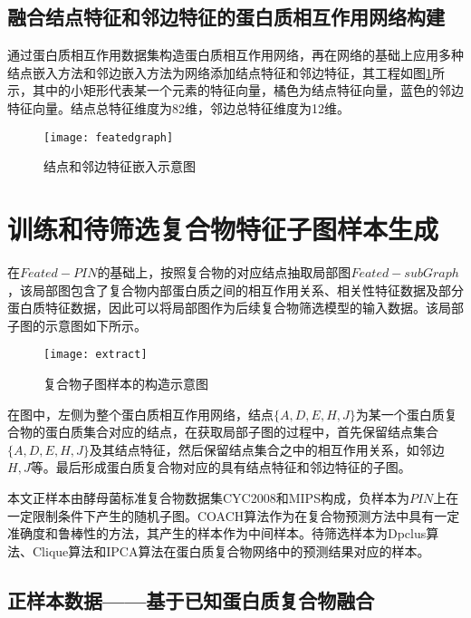 \subsection{融合结点特征和邻边特征的蛋白质相互作用网络构建}
\label{subsection:featPPINetwork:addFeat}

通过蛋白质相互作用数据集构造蛋白质相互作用网络，再在网络的基础上应用多种结点嵌入方法和邻边嵌入方法为网络添加结点特征和邻边特征，其工程如图\ref{fig:featedgraph}所示，其中的小矩形代表某一个元素的特征向量，橘色为结点特征向量，蓝色的邻边特征向量。结点总特征维度为82维，邻边总特征维度为12维。

\begin{figure}[htbp]
    \centering
    \texttt{[image: featedgraph]}
    \caption{结点和邻边特征嵌入示意图}
    \label{fig:featedgraph}
\end{figure}


\section{训练和待筛选复合物特征子图样本生成}
\label{section:featSubNetworkConstruct:allSample}

在$Feated-PIN$的基础上，按照复合物的对应结点抽取局部图$Feated-subGraph$，该局部图包含了复合物内部蛋白质之间的相互作用关系、相关性特征数据及部分蛋白质特征数据，因此可以将局部图作为后续复合物筛选模型的输入数据。该局部子图的示意图如下所示。

\begin{figure}[htbp]
    \centering
    \texttt{[image: extract]}
    \caption{复合物子图样本的构造示意图}
    \label{fig:extract}
\end{figure}
在图中，左侧为整个蛋白质相互作用网络，结点$\{A,D,E,H,J\}$为某一个蛋白质复合物的蛋白质集合对应的结点，在获取局部子图的过程中，首先保留结点集合$\{A,D,E,H,J\}$及其结点特征，然后保留结点集合之中的相互作用关系，如邻边$H,J$等。最后形成蛋白质复合物对应的具有结点特征和邻边特征的子图。

本文正样本由酵母菌标准复合物数据集CYC2008\cite{pu_up--date_2009}和MIPS\cite{pagel_mips_2005}构成，负样本为$PIN$上在一定限制条件下产生的随机子图。COACH算法\cite{leung_predicting_2009}作为在复合物预测方法中具有一定准确度和鲁棒性的方法，其产生的样本作为中间样本。待筛选样本为Dpclus算法、Clique算法和IPCA算法在蛋白质复合物网络中的预测结果对应的样本。


\subsection{正样本数据——基于已知蛋白质复合物融合}
\label{subsection:allSample:positiveSampleData}

